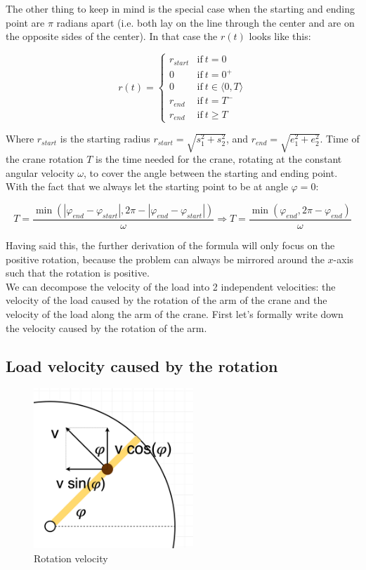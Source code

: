 \documentclass[11pt]{article}
\begin{document}
The other thing to keep in mind is the special case when the starting and ending point are $\pi$ radians apart (i.e. both lay on the line through the center and are on the opposite sides of the center). In that case the $r(t)$ looks like this:

\[ r(t) = \begin{cases}
      r_{start} & \text{if} \ t = 0 \\
      0 & \text{if} \ t = 0^{+} \\
      0 & \text{if} \ t \in \langle 0,T \rangle \\
      r_{end} & \text{if} \ t = T^{-} \\
      r_{end} & \text{if} \ t \geq T
   \end{cases}
\]

Where $r_{start}$ is the starting radius $r_{start} = \sqrt{s_1^2 + s_2^2}$, and $r_{end} = \sqrt{e_1^2 + e_2^2}$. Time of the crane rotation $T$ is the time needed for the crane, rotating at the constant angular velocity $\omega$, to cover the angle between the starting and ending point. With the fact that we always let the starting point to be at angle $\varphi = 0$:

\[
    T = \frac{\min{(|\varphi_{end} - \varphi_{start}|, 2\pi - |\varphi_{end} - \varphi_{start}|)}}{\omega} \Rightarrow T = \frac{\min{(\varphi_{end}, 2\pi - \varphi_{end})}}{\omega}
\]

Having said this, the further derivation of the formula will only focus on the positive rotation, because the problem can always be mirrored around the $x$-axis such that the rotation is positive.\\

We can decompose the velocity of the load into 2 independent velocities: the velocity of the load caused by the rotation of the arm of the crane and the velocity of the load along the arm of the crane. First let's formally write down the velocity caused by the rotation of the arm.\\

\subsection{Load velocity caused by the rotation}

\begin{figure}[H]
\centering
\includegraphics[width=6cm]{rotation_velocity.jpg}
\caption{Rotation velocity}
\label{fig:rot_velocity}
\end{figure}
\end{document}
